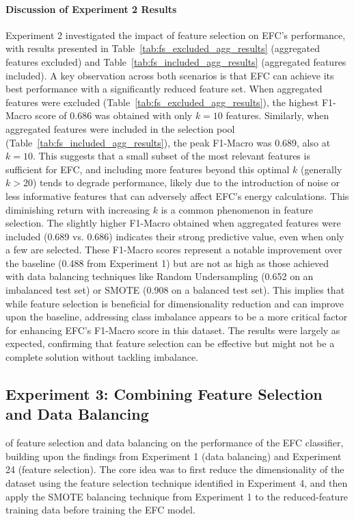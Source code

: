 \documentclass[12pt]{article}
\begin{document}
\paragraph{Discussion of Experiment 2 Results}
Experiment 2 investigated the impact of feature selection on EFC's performance, with results presented in
Table~\ref{tab:fs_excluded_agg_results} (aggregated features excluded) and Table~\ref{tab:fs_included_agg_results}
(aggregated features included). A key observation across both scenarios is that EFC can achieve its best performance with
a significantly reduced feature set. When aggregated features were excluded (Table~\ref{tab:fs_excluded_agg_results}),
the highest F1-Macro score of 0.686 was obtained with only $k=10$ features. Similarly, when aggregated features were
included in the selection pool (Table~\ref{tab:fs_included_agg_results}), the peak F1-Macro was 0.689, also at $k=10$.
This suggests that a small subset of the most relevant features is sufficient for EFC, and including more features beyond
this optimal $k$ (generally $k>20$) tends to degrade performance, likely due to the introduction of noise or less
informative features that can adversely affect EFC's energy calculations. This diminishing return with increasing $k$ is
a common phenomenon in feature selection. The slightly higher F1-Macro obtained when aggregated features were included
(0.689 vs. 0.686) indicates their strong predictive value, even when only a few are selected. These F1-Macro scores represent
a notable improvement over the baseline (0.488 from Experiment 1) but are not as high as those achieved with data balancing
techniques like Random Undersampling (0.652 on an imbalanced test set) or SMOTE (0.908 on a balanced test set). This implies
that while feature selection is beneficial for dimensionality reduction and can improve upon the baseline, addressing
class imbalance appears to be a more critical factor for enhancing EFC's F1-Macro score in this dataset. The results were
largely as expected, confirming that feature selection can be effective but might not be a complete solution without tackling
imbalance.

\subsection{Experiment 3: Combining Feature Selection and Data Balancing} \label{subsec:experiment_3}
of feature selection and data balancing on the performance of the EFC classifier, building upon the findings from
Experiment 1 (data balancing) and Experiment 24 (feature selection). The core idea was to first reduce the dimensionality
of the dataset using the feature selection technique identified in Experiment 4, and then apply the SMOTE balancing
technique from Experiment 1 to the reduced-feature training data before training the EFC model.
\end{document}
